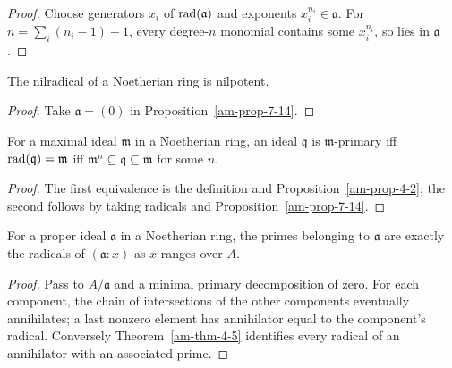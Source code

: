 \begin{proof}
Choose generators $x_i$ of $\operatorname{rad}(\mathfrak{a})$ and exponents $x_i^{n_i}\in\mathfrak{a}$.
For $n=\sum_i(n_i-1)+1$, every degree-$n$ monomial contains some
$x_i^{n_i}$, so lies in $\mathfrak{a}$.
\end{proof}
\begin{corollary}
\label{am-cor-7-15}
\uses{}
The nilradical of a Noetherian ring is nilpotent.
\end{corollary}
\begin{proof}
Take $\mathfrak{a}=(0)$ in Proposition~\ref{am-prop-7-14}.
\end{proof}
\begin{corollary}
\label{am-cor-7-16}
\uses{}
For a maximal ideal $\mathfrak{m}$ in a Noetherian ring, an ideal $\mathfrak{q}$ is $\mathfrak{m}$-primary iff
$\operatorname{rad}(\mathfrak{q})=\mathfrak{m}$ iff $\mathfrak{m}^n\subseteq\mathfrak{q}\subseteq\mathfrak{m}$ for some $n$.
\end{corollary}
\begin{proof}
The first equivalence is the definition and Proposition~\ref{am-prop-4-2};
the second follows by taking radicals and Proposition~\ref{am-prop-7-14}.
\end{proof}
\begin{proposition}
\label{am-prop-7-17}
\uses{}
For a proper ideal $\mathfrak{a}$ in a Noetherian ring, the primes belonging to
$\mathfrak{a}$ are exactly the radicals of $(\mathfrak{a}:x)$ as $x$ ranges over $A$.
\end{proposition}
\begin{proof}
Pass to $A/\mathfrak{a}$ and a minimal primary decomposition of zero.  For each
component, the chain of intersections of the other components eventually
annihilates; a last nonzero element has annihilator equal to the component's
radical.  Conversely Theorem~\ref{am-thm-4-5} identifies every radical of an
annihilator with an associated prime.
\end{proof}
